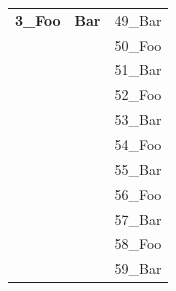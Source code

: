 \begin{Chapter}
\begin{longtable}{|p{}|p{}|p{}|}
\hline
\textbf{3\_Foo}&\textbf{Bar}&49\_Bar\\
&&50\_Foo\\
&&51\_Bar\\
&&52\_Foo\\
&&53\_Bar\\
&&54\_Foo\\
&&55\_Bar\\
&&56\_Foo\\
&&57\_Bar\\
&&58\_Foo\\
&&59\_Bar\\
\hline
\end{longtable}

\end{Chapter}